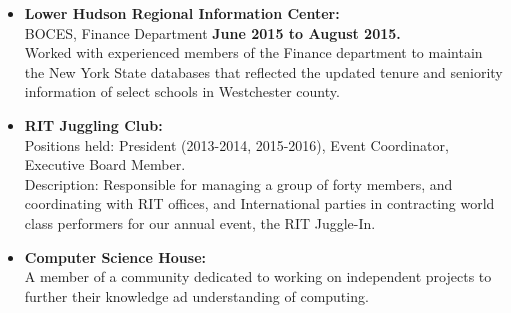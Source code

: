 \documentclass[10pt]{article}
\begin{document}
\begin{itemize}[topsep=1ex, itemsep=1ex, partopsep=0ex, parsep=.25ex]
	\item[]{{\bf Lower Hudson Regional Information Center:}\\ 
	BOCES, Finance Department \hfill {\bf June 2015 to August 2015.}}\\
	Worked with experienced members of the Finance department to maintain the New York
	State databases that reflected the updated tenure and seniority information of select schools in Westchester county.
\end{itemize}
\vspace{.75ex}
\begin{itemize} [topsep=1ex, itemsep=.25ex, partopsep=0ex, parsep=.25ex]
	\item[] {\bf RIT Juggling Club:}\\
	Positions held: President (2013-2014, 2015-2016), Event Coordinator, Executive Board Member.\\
	Description: Responsible for managing a group of forty members, and coordinating with RIT offices, and International parties in contracting world class performers for our annual event, the RIT Juggle-In.
	\item[] {\bf Computer Science House:}\\
	A member of a community dedicated to working on independent projects to further their knowledge ad understanding of computing.
\end{itemize}
\end{document}
